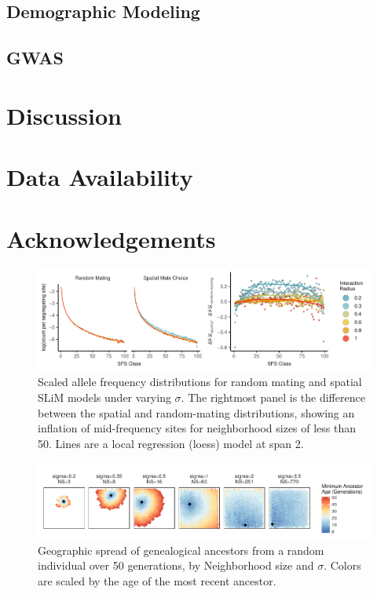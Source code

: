 \documentclass[9pt,twocolumn,twoside]{gsajnl}
\begin{document}
\subsection{Demographic Modeling}
\subsection{GWAS}

\section{Discussion}

\section{Data Availability}

\section{Acknowledgements}

\begin{figure}[h!]
\centering
\includegraphics[width=\textwidth]{sfs_spatial_v_rm.pdf}
\caption{Scaled allele frequency distributions for random mating and spatial SLiM models under varying $\sigma$. The rightmost panel is the difference between the spatial and random-mating distributions, showing an inflation of mid-frequency sites for neighborhood sizes of less than 50. Lines are a local regression (loess) model at span 2.}
\label{fig:spectrum}
\end{figure}

\begin{figure}[h!]
\centering
\includegraphics[width=\textwidth]{min_ancestor_age_maps.pdf}
\caption{Geographic spread of genealogical ancestors from a random individual over 50 generations, by Neighborhood size and $\sigma$. Colors are scaled by the age of the most recent ancestor.}
\label{fig:spectrum}
\end{figure}
\end{document}
